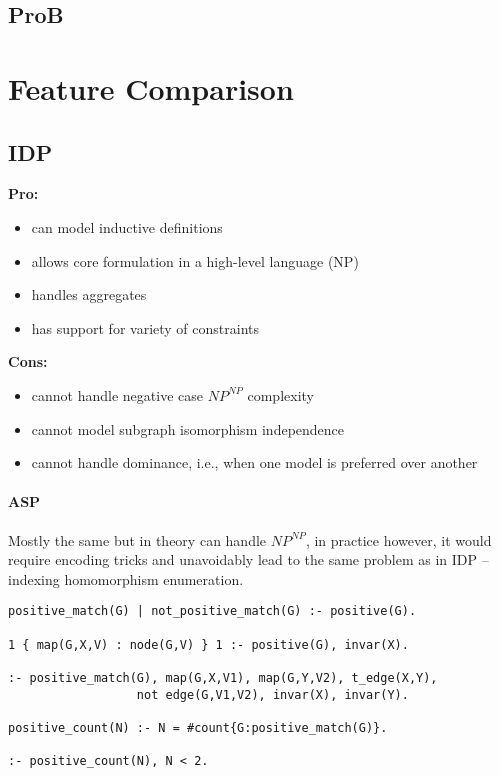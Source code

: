 \documentclass{article}
\theoremstyle{definition}
\begin{document}
\subsection{ProB}

\section{Feature Comparison}

\subsection{IDP} 

\textbf{Pro:}
\begin{itemize}
  \item can model inductive definitions
  \item allows core formulation in a high-level language (NP)
  \item handles aggregates
  \item has support for variety of constraints
\end{itemize}
\textbf{Cons:}
\begin{itemize}
  \item cannot handle negative case $\textit{NP}^\textit{NP}$ complexity
  \item cannot model subgraph isomorphism independence
  \item cannot handle dominance, i.e., when one model is preferred over another 
\end{itemize}

\paragraph{ASP}
Mostly the same but in theory can handle $\textit{NP}^\textit{NP}$, in practice however, it would require encoding tricks and unavoidably lead to the same problem as in IDP -- indexing homomorphism enumeration.

\lstset{basicstyle=\footnotesize\ttfamily,breaklines=true}
\begin{lstlisting}[caption=ASP positive matching]
positive_match(G) | not_positive_match(G) :- positive(G).

1 { map(G,X,V) : node(G,V) } 1 :- positive(G), invar(X).

:- positive_match(G), map(G,X,V1), map(G,Y,V2), t_edge(X,Y), 
                  not edge(G,V1,V2), invar(X), invar(Y).

positive_count(N) :- N = #count{G:positive_match(G)}.

:- positive_count(N), N < 2.
\end{lstlisting}
\end{document}
